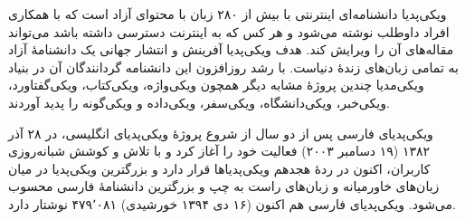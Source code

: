 ویکی‌پدیا دانشنامه‌ای اینترنتی با بیش از ۲۸۰ زبان با محتوای آزاد است که با همکاری افراد داوطلب نوشته می‌شود و هر کس که به اینترنت دسترسی داشته باشد می‌تواند مقاله‌های آن را ویرایش کند.
هدف ویکی‌پدیا آفرینش و انتشار جهانی یک دانشنامهٔ آزاد به تمامی زبان‌های زندهٔ دنیاست. با رشد روزافزون این دانشنامه گردانندگان آن در بنیاد ویکی‌مدیا چندین پروژهٔ مشابه دیگر همچون ویکی‌واژه، ویکی‌کتاب، ویکی‌گفتاورد، ویکی‌خبر، ویکی‌دانشگاه، ویکی‌سفر، ویکی‌داده و ویکی‌گونه را پدید آوردند.

ویکی‌پدیای فارسی پس از دو سال از شروع پروژهٔ ویکی‌پدیای انگلیسی، در ۲۸ آذر ۱۳۸۲ (۱۹ دسامبر ۲۰۰۳) فعالیت خود را آغاز کرد و با تلاش و کوشش شبانه‌روزی کاربران، اکنون در ردهٔ هجدهم ویکی‌پدیاها قرار دارد و بزرگترین ویکی‌پدیا در میان زبان‌های خاورمیانه و زبان‌های راست به چپ و بزرگترین دانشنامهٔ فارسی محسوب می‌شود. ویکی‌پدیای فارسی هم اکنون (۱۶ دی ۱۳۹۴ خورشیدی) ۴۷۹٬۰۸۱ نوشتار دارد.
